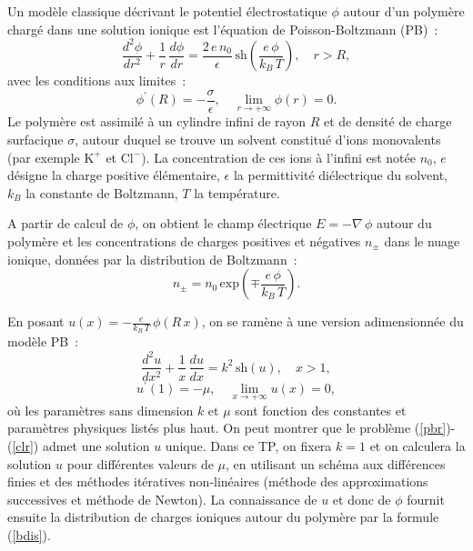 \documentclass[a4paper,10pt]{article}
\begin{document}
Un mod\`ele classique d\'ecrivant le potentiel \'electrostatique $\phi$ autour d'un polym\`ere charg\'e dans une solution ionique
est l'\'equation de Poisson-Boltzmann (PB)~:
\begin{equation}
\label{pb}
\frac{d^2 \phi}{dr^2} + \frac{1}{r}\, \frac{d\phi}{dr} = \frac{2\, e\, n_0}{\epsilon}\, \mathrm{sh}\left(\frac{e\, \phi}{k_B\, T} \right), \quad r > R,
\end{equation} 
avec les conditions aux limites~:
\begin{equation}
\label{cl}
\phi^\prime (R)=-\frac{\sigma}{\epsilon}, \quad
\lim_{r\rightarrow +\infty}{\phi(r)}=0.
\end{equation} 
Le polym\`ere est assimil\'e \`a un cylindre infini de rayon $R$ et de densit\'e de charge surfacique $\sigma$, 
autour duquel se trouve un solvent constitu\'e d'ions monovalents
(par exemple $\mathrm{K}^+$ et $\mathrm{Cl}^-$). La concentration de ces ions \`a l'infini est not\'ee $n_0$, $e$ d\'esigne la 
charge positive \'el\'ementaire, $\epsilon$ la permittivit\'e di\'electrique du solvent, $k_B$ la constante de Boltzmann, 
$T$ la temp\'erature. 

A partir de calcul de $\phi$, on obtient le champ \'electrique $E=-\nabla\, \phi$
autour du polym\`ere et les concentrations de charges positives et n\'egatives $n_{\pm}$ 
dans le nuage ionique, donn\'ees par la distribution de Boltzmann~:
\begin{equation}
\label{bdis}
n_{\pm}=n_0\, \mathrm{exp}\left( \mp \frac{e\, \phi}{k_B\, T} \right).
\end{equation}

En posant $u(x)=-\frac{e}{k_B\, T}\, \phi (R\, x)$, on se ram\`ene \`a une version 
adimensionn\'ee du mod\`ele PB~:
\begin{equation}
\label{pbr}
\frac{d^2 u}{dx^2} + \frac{1}{x}\, \frac{du}{dx} = k^2\, 
\mathrm{sh}\left( u \right), \quad x > 1,
\end{equation} 
\begin{equation}
\label{clr}
u^\prime (1)=-\mu , \quad
\lim_{x\rightarrow +\infty}{u(x)}=0,
\end{equation} 
o\`u les param\`etres sans dimension $k$ et $\mu$ sont fonction des constantes et param\`etres physiques list\'es plus haut.
On peut montrer que le probl\`eme (\ref{pbr})-(\ref{clr}) admet une solution $u$ unique.
Dans ce TP, on fixera $k=1$ et on calculera la solution $u$ pour diff\'erentes valeurs de $\mu$, en utilisant
un sch\'ema aux diff\'erences finies et 
des m\'ethodes it\'eratives non-lin\'eaires (m\'ethode des approximations successives et m\'ethode de Newton).
La connaissance de $u$ et donc de $\phi$ fournit ensuite la distribution de charges ioniques 
autour du polym\`ere par la formule (\ref{bdis}).
\end{document}
